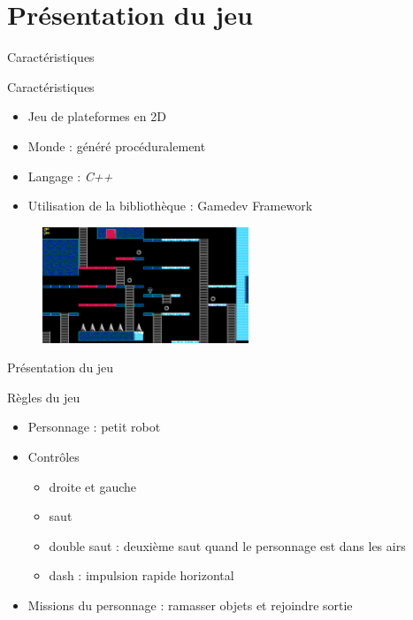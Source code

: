 \documentclass{beamer}
\begin{document}
{\section{Présentation du jeu}
\begin{frame}{Caractéristiques}
    \begin{block}{Caractéristiques}
        \begin{itemize}
            \item[\bullet] Jeu de plateformes en 2D
            \item[\bullet] Monde : généré procéduralement
            \item[\bullet] Langage : \emph{C++}
            \item[\bullet] Utilisation de la bibliothèque : Gamedev Framework
        \end{itemize}
    \end{block}
    \begin{figure}
            \centering
            \includegraphics[width=0.55\textwidth]{images/world_example}
        \end{figure}
\end{frame}

\begin{frame}{Présentation du jeu}
    \begin{block}{Règles du jeu}
        \begin{itemize}
            \item[\bullet] Personnage : petit robot
            \item[\bullet] Contrôles
            \begin{itemize}
                \item droite et gauche
                \item saut
                \item double saut : deuxième saut quand le personnage est dans les airs
                \item dash : impulsion rapide horizontal
            \end{itemize}
            \item[\bullet] Missions du personnage : ramasser objets et rejoindre sortie
        \end{itemize}
    \end{block}
\end{frame}

}
\end{document}
